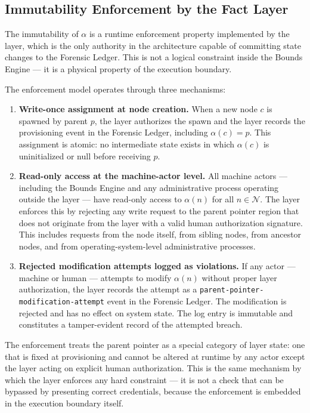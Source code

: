 \subsection{Immutability Enforcement by the Fact Layer}

The immutability of $\alpha$ is a runtime enforcement property implemented by the \fact{} layer, which is the only authority in the \bxthree{} architecture capable of committing state changes to the Forensic Ledger. This is not a logical constraint inside the Bounds Engine — it is a physical property of the execution boundary.

The enforcement model operates through three mechanisms:

\begin{enumerate}
\item[$\mathbf{F_1}$] \textbf{Write-once assignment at node creation.} When a new node $c$ is spawned by parent $p$, the \purpose{} layer authorizes the spawn and the \fact{} layer records the provisioning event in the Forensic Ledger, including $\alpha(c) = p$. This assignment is atomic: no intermediate state exists in which $\alpha(c)$ is uninitialized or null before receiving $p$.

\item[$\mathbf{F_2}$] \textbf{Read-only access at the machine-actor level.} All machine actors — including the Bounds Engine and any administrative process operating outside the \purpose{} layer — have read-only access to $\alpha(n)$ for all $n \in \mathcal{N}$. The \fact{} layer enforces this by rejecting any write request to the parent pointer region that does not originate from the \purpose{} layer with a valid human authorization signature. This includes requests from the node itself, from sibling nodes, from ancestor nodes, and from operating-system-level administrative processes.

\item[$\mathbf{F_3}$] \textbf{Rejected modification attempts logged as violations.} If any actor — machine or human — attempts to modify $\alpha(n)$ without proper \purpose{} layer authorization, the \fact{} layer records the attempt as a \texttt{parent-pointer-modification-attempt} event in the Forensic Ledger. The modification is rejected and has no effect on system state. The log entry is immutable and constitutes a tamper-evident record of the attempted breach.
\end{enumerate}

The enforcement treats the parent pointer as a special category of \fact{} layer state: one that is fixed at provisioning and cannot be altered at runtime by any actor except the \purpose{} layer acting on explicit human authorization. This is the same mechanism by which the \fact{} layer enforces any hard constraint — it is not a check that can be bypassed by presenting correct credentials, because the enforcement is embedded in the execution boundary itself.

